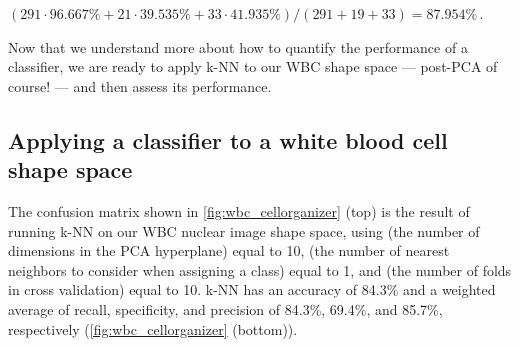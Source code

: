 \begin{center}
$(291 \cdot 96.667\% + 21 \cdot 39.535\% + 33 \cdot 41.935\%)/(291+19+33) = 87.954\%$\,.
\end{center}

Now that we understand more about how to quantify the performance of a classifier, we are ready to apply k-NN to our WBC shape space --- post-PCA of course! --- and then assess its performance.

\FloatBarrier
{}
\subsection{Applying a classifier to a white blood cell shape space}

The confusion matrix shown in \autoref{fig:wbc_cellorganizer} (top) is the result of running k-NN on our WBC nuclear image shape space, using  (the number of dimensions in the PCA hyperplane) equal to 10,  (the number of nearest neighbors to consider when assigning a class) equal to 1, and  (the number of folds in cross validation) equal to 10. k-NN has an accuracy of 84.3\% and a weighted average of recall, specificity, and precision of 84.3\%, 69.4\%, and 85.7\%, respectively (\autoref{fig:wbc_cellorganizer} (bottom)).\\

